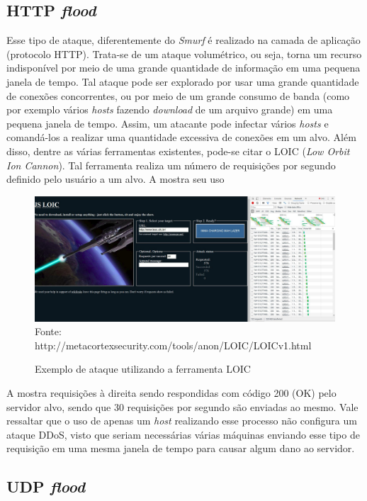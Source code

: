 \subsection{HTTP \textit{flood}}
Esse tipo de ataque, diferentemente do \textit{Smurf} é realizado na camada de aplicação (protocolo HTTP). Trata-se de um ataque volumétrico, ou seja, torna um recurso indisponível por meio de uma grande quantidade de informação em uma pequena janela de tempo. Tal ataque pode ser explorado por  usar uma grande quantidade de conexões concorrentes, ou por meio de um grande consumo de banda (como por exemplo vários \textit{hosts} fazendo \textit{download} de um arquivo grande) em uma pequena janela de tempo. Assim, um atacante pode infectar vários \textit{hosts} e comandá-los a realizar uma quantidade excessiva de conexões em um alvo. Além disso, dentre as várias ferramentas existentes, pode-se citar o LOIC (\textit{Low Orbit Ion Cannon}). Tal ferramenta realiza um número de requisições por segundo definido pelo usuário a um alvo. A  mostra seu uso 
 
 \begin{figure}[ht]
 	\centering
 	\caption{Exemplo de ataque utilizando a ferramenta LOIC }
 	\includegraphics[width=1\textwidth]{figs/loic.pdf}\\
 	{Fonte: http://metacortexsecurity.com/tools/anon/LOIC/LOICv1.html}
 	\label{fig:loic}
 \end{figure} 
 
 A  mostra requisições à direita sendo respondidas com código 200 (OK) pelo servidor alvo, sendo que 30 requisições por segundo são enviadas ao mesmo. Vale ressaltar que o uso de apenas um \textit{host} realizando  esse processo não configura um ataque DDoS, visto que seriam necessárias várias máquinas enviando esse tipo de requisição em uma mesma janela de tempo para causar algum dano ao servidor.
 
 \subsection{UDP \textit{flood}}
 
